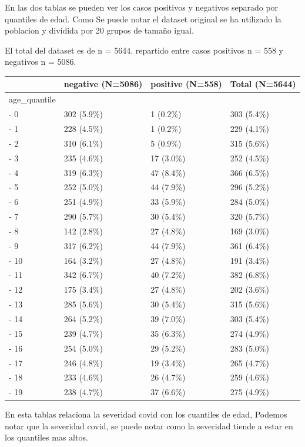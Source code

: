 \documentclass[
]{article}
\begin{document}
En las dos tablas se pueden ver los casos positivos y negativos separado
por quantiles de edad. Como Se puede notar el dataset original se ha
utilizado la poblacion y dividida por 20 grupos de tamaño igual.

El total del dataset es de n = 5644. repartido entre casos positivos n =
558 y negativos n = 5086.

\begin{longtable}[]{@{}llll@{}}
\toprule()
& negative (N=5086) & positive (N=558) & Total (N=5644) \\
\midrule()
\endhead
age\_quantile & & & \\
- 0 & 302 (5.9\%) & 1 (0.2\%) & 303 (5.4\%) \\
- 1 & 228 (4.5\%) & 1 (0.2\%) & 229 (4.1\%) \\
- 2 & 310 (6.1\%) & 5 (0.9\%) & 315 (5.6\%) \\
- 3 & 235 (4.6\%) & 17 (3.0\%) & 252 (4.5\%) \\
- 4 & 319 (6.3\%) & 47 (8.4\%) & 366 (6.5\%) \\
- 5 & 252 (5.0\%) & 44 (7.9\%) & 296 (5.2\%) \\
- 6 & 251 (4.9\%) & 33 (5.9\%) & 284 (5.0\%) \\
- 7 & 290 (5.7\%) & 30 (5.4\%) & 320 (5.7\%) \\
- 8 & 142 (2.8\%) & 27 (4.8\%) & 169 (3.0\%) \\
- 9 & 317 (6.2\%) & 44 (7.9\%) & 361 (6.4\%) \\
- 10 & 164 (3.2\%) & 27 (4.8\%) & 191 (3.4\%) \\
- 11 & 342 (6.7\%) & 40 (7.2\%) & 382 (6.8\%) \\
- 12 & 175 (3.4\%) & 27 (4.8\%) & 202 (3.6\%) \\
- 13 & 285 (5.6\%) & 30 (5.4\%) & 315 (5.6\%) \\
- 14 & 264 (5.2\%) & 39 (7.0\%) & 303 (5.4\%) \\
- 15 & 239 (4.7\%) & 35 (6.3\%) & 274 (4.9\%) \\
- 16 & 254 (5.0\%) & 29 (5.2\%) & 283 (5.0\%) \\
- 17 & 246 (4.8\%) & 19 (3.4\%) & 265 (4.7\%) \\
- 18 & 233 (4.6\%) & 26 (4.7\%) & 259 (4.6\%) \\
- 19 & 238 (4.7\%) & 37 (6.6\%) & 275 (4.9\%) \\
\bottomrule()
\end{longtable}

En esta tablas relaciona la severidad covid con los cuantiles de edad,
Podemos notar que la severidad covid, se puede notar como la severidad
tiende a estar en los quantiles mas altos.
\end{document}

